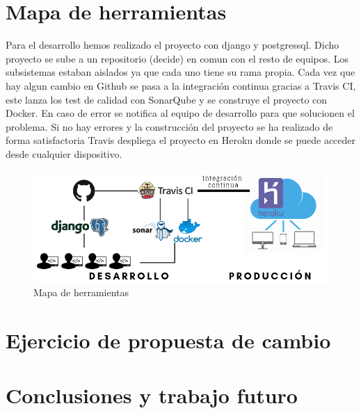 \documentclass[12pt]{article}
\begin{document}
\section{Mapa de herramientas}

Para el desarrollo hemos realizado el proyecto con django y postgressql. Dicho proyecto se sube a un repositorio (decide) en comun con el resto de equipos. Los subsistemas estaban aislados ya que cada uno tiene su rama propia. Cada vez que hay algun cambio en Github se pasa a la integración continua gracias a Travis CI, este lanza los test de calidad con SonarQube y se construye el proyecto con Docker. En caso de error se notifica al equipo de desarrollo para que solucionen el problema. Si no hay errores y la construcción del proyecto se ha realizado de forma satisfactoria Travis despliega el proyecto en Heroku donde se puede acceder desde cualquier dispositivo.

\begin{figure}[hbt!]
\centering
\includegraphics[width=1\textwidth]{Desarrollo.png}
\caption{Mapa de herramientas}
\end{figure}


\section{Ejercicio de propuesta de cambio}


\section{Conclusiones y trabajo futuro}

\newpage	
\end{document}

